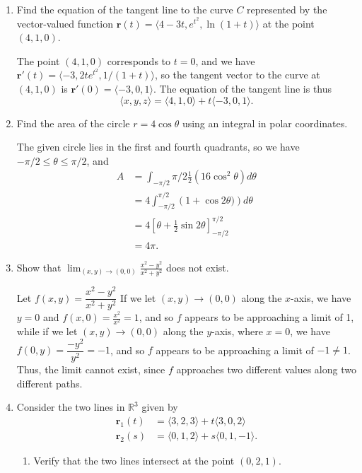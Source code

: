 \documentclass[12pt]{article}
\newcommand{\points}[1]{\marginpar{\hspace{24pt}[#1]}}
\newcommand{\di}{\displaystyle}
\newcommand{\R}{\mathbb{R}}
\renewcommand{\r}{\mathbf{r}}
\begin{document}
\begin{enumerate}
\item Find the equation of the tangent line to the curve $C$ represented by the vector-valued function $\mathbf{r}(t) = \langle 4-3t, e^{t^2}, \ln(1+t)\rangle$ at the point $(4,1,0)$.\points{4}

\bigskip

The point $(4,1,0)$ corresponds to $t=0$, and we have $\r'(t) = \langle -3, 2te^{t^2}, 1/(1+t)\rangle$, so the tangent vector to the curve at $(4,1,0)$ is $\r'(0) = \langle -3, 0, 1\rangle$. The equation of the tangent line is thus
\[
 \langle x,y,z\rangle = \langle 4, 1, 0\rangle +t\langle -3, 0, 1\rangle.
\]

\bigskip

\bigskip

\item Find the area of the circle $r=4\cos\theta$ using an integral in polar coordinates. \points{5}

\bigskip

The given circle lies in the first and fourth quadrants, so we have $-\pi/2\leq\theta\leq \pi/2$, and
\begin{align*}
 A &= \int_{-\pi/2}{\pi/2}\frac{1}{2}\left(16\cos^2\theta\right)d\theta\\
& = 4\int_{-\pi/2}^{\pi/2}\left(1+\cos 2\theta)\right)d\theta\\
& = 4\left[\theta+\frac{1}{2}\sin 2\theta\right]_{-\pi/2}^{\pi/2}\\
& = 4\pi.
\end{align*}

\bigskip

\bigskip

\item Show that $\di \lim_{(x,y)\to (0,0)}\frac{x^2-y^2}{x^2+y^2}$ does not exist. \points{3}

\bigskip

Let $f(x,y) = \dfrac{x^2-y^2}{x^2+y^2}$ If we let $(x,y)\to (0,0)$ along the $x$-axis, we have $y=0$ and  $f(x,0)= \frac{x^2}{x^2}=1$, and so $f$ appears to be approaching a limit of 1, while if we let $(x,y)\to (0,0)$ along the $y$-axis, where $x=0$, we have $f(0,y) = \dfrac{-y^2}{y^2}=-1$, and so $f$ appears to be approaching a limit of $-1\neq 1$. Thus, the limit cannot exist, since $f$ approaches two different values along two different paths.
\newpage

\item Consider the two lines in $\R^3$ given by
\begin{align*}
\mathbf{r}_1(t) & = \langle 3,2,3\rangle + t\langle 3,0,2\rangle\\
\mathbf{r}_2(s) & = \langle 0,1,2\rangle +s\langle 0,1,-1\rangle.
\end{align*}
\begin{enumerate}
\item Verify that the two lines intersect at the point $(0,2,1)$. \points{2}


\end{enumerate}
\end{enumerate}
\end{document}
